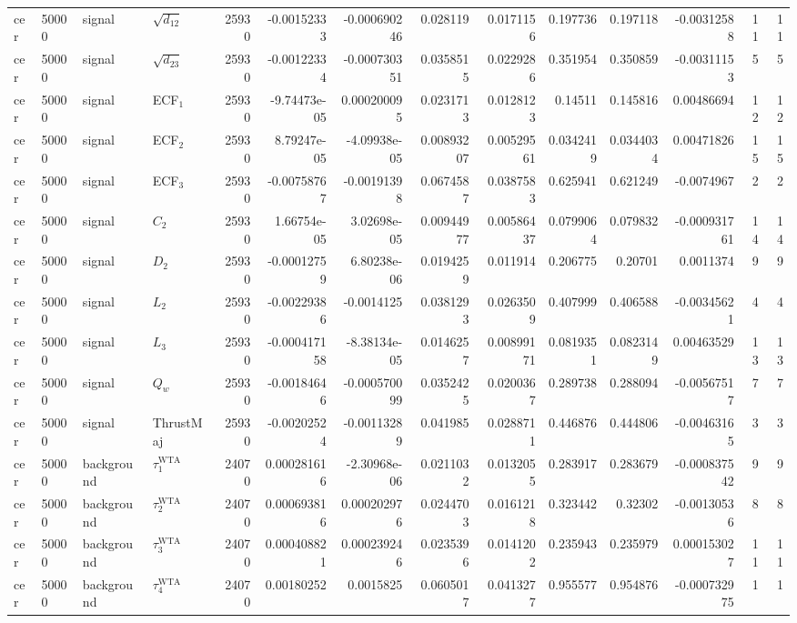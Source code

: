 \begin{landscape}
\begin{longtable}{llll r rrrr rr r rr}
cer & 50000 & signal & $\sqrt{d_{12}}$ & 25930 & -0.00152333 & -0.000690246 & 0.028119 & 0.0171156 & 0.197736 & 0.197118 & -0.00312588 & 11 & 11 \\
cer & 50000 & signal & $\sqrt{d_{23}}$ & 25930 & -0.00122334 & -0.000730351 & 0.0358515 & 0.0229286 & 0.351954 & 0.350859 & -0.00311153 & 5 & 5 \\
cer & 50000 & signal & ECF$_1$ & 25930 & -9.74473e-05 & 0.000200095 & 0.0231713 & 0.0128123 & 0.14511 & 0.145816 & 0.00486694 & 12 & 12 \\
cer & 50000 & signal & ECF$_2$ & 25930 & 8.79247e-05 & -4.09938e-05 & 0.00893207 & 0.00529561 & 0.0342419 & 0.0344034 & 0.00471826 & 15 & 15 \\
cer & 50000 & signal & ECF$_3$ & 25930 & -0.00758767 & -0.00191398 & 0.0674587 & 0.0387583 & 0.625941 & 0.621249 & -0.0074967 & 2 & 2 \\
cer & 50000 & signal & $C_2$ & 25930 & 1.66754e-05 & 3.02698e-05 & 0.00944977 & 0.00586437 & 0.0799064 & 0.079832 & -0.000931761 & 14 & 14 \\
cer & 50000 & signal & $D_2$ & 25930 & -0.00012759 & 6.80238e-06 & 0.0194259 & 0.011914 & 0.206775 & 0.20701 & 0.0011374 & 9 & 9 \\
cer & 50000 & signal & $L_2$ & 25930 & -0.00229386 & -0.0014125 & 0.0381293 & 0.0263509 & 0.407999 & 0.406588 & -0.00345621 & 4 & 4 \\
cer & 50000 & signal & $L_3$ & 25930 & -0.000417158 & -8.38134e-05 & 0.0146257 & 0.00899171 & 0.0819351 & 0.0823149 & 0.00463529 & 13 & 13 \\
cer & 50000 & signal & $Q_w$ & 25930 & -0.00184646 & -0.000570099 & 0.0352425 & 0.0200367 & 0.289738 & 0.288094 & -0.00567517 & 7 & 7 \\
cer & 50000 & signal & ThrustMaj & 25930 & -0.00202524 & -0.00113289 & 0.041985 & 0.0288711 & 0.446876 & 0.444806 & -0.00463165 & 3 & 3 \\
cer & 50000 & background & $\tau_1^{\mathrm{WTA}}$ & 24070 & 0.000281616 & -2.30968e-06 & 0.0211032 & 0.0132055 & 0.283917 & 0.283679 & -0.000837542 & 9 & 9 \\
cer & 50000 & background & $\tau_2^{\mathrm{WTA}}$ & 24070 & 0.000693816 & 0.000202976 & 0.0244703 & 0.0161218 & 0.323442 & 0.32302 & -0.00130536 & 8 & 8 \\
cer & 50000 & background & $\tau_3^{\mathrm{WTA}}$ & 24070 & 0.000408821 & 0.000239246 & 0.0235396 & 0.0141202 & 0.235943 & 0.235979 & 0.000153027 & 11 & 11 \\
cer & 50000 & background & $\tau_4^{\mathrm{WTA}}$ & 24070 & 0.00180252 & 0.0015825 & 0.0605017 & 0.0413277 & 0.955577 & 0.954876 & -0.000732975 & 1 & 1 \\

\end{longtable}
\end{landscape}
